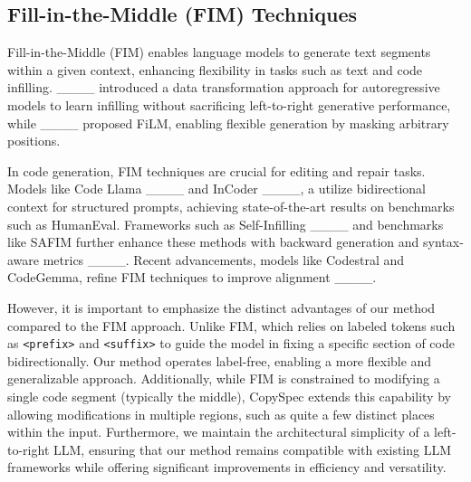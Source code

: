 \subsection{Fill-in-the-Middle (FIM) Techniques}

Fill-in-the-Middle (FIM) enables language models to generate text segments within a given context, enhancing flexibility in tasks such as text and code infilling. ____ introduced a data transformation approach for autoregressive models to learn infilling without sacrificing left-to-right generative performance, while ____ proposed FiLM, enabling flexible generation by masking arbitrary positions.

In code generation, FIM techniques are crucial for editing and repair tasks. Models like Code Llama ____ and InCoder ____, a utilize bidirectional context for structured prompts, achieving state-of-the-art results on benchmarks such as HumanEval. Frameworks such as Self-Infilling ____ and benchmarks like SAFIM further enhance these methods with backward generation and syntax-aware metrics ____. Recent advancements, models like Codestral and CodeGemma, refine FIM techniques to improve alignment ____.

However, it is important to emphasize the distinct advantages of our method compared to the FIM approach. Unlike FIM, which relies on labeled tokens such as \texttt{<prefix>} and \texttt{<suffix>} to guide the model in fixing a specific section of code bidirectionally. Our method operates label-free, enabling a more flexible and generalizable approach. Additionally, while FIM is constrained to modifying a single code segment (typically the middle), CopySpec extends this capability by allowing modifications in multiple regions, such as quite a few distinct places within the input. Furthermore, we maintain the architectural simplicity of a left-to-right LLM, ensuring that our method remains compatible with existing LLM frameworks while offering significant improvements in efficiency and versatility.